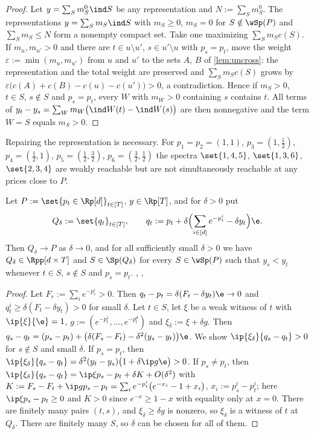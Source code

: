 \begin{proof}
Let $y=\sum_Sm^0_S\ind S$ be any representation and $N:=\sum_Sm^0_S$. The representations $y=\sum_Sm_S\ind S$ with $m_S\ge0$, $m_S=0$ for $S\notin\wSp(P)$ and $\sum_Sm_S\le N$ form a nonempty compact set. Take one maximizing $\sum_Sm_Sc(S)$. If $m_u,m_{u'}>0$ and there are $t\in u\setminus u'$, $s\in u'\setminus u$ with $p_s=p_t$, move the weight $\varepsilon:=\min(m_u,m_{u'})$ from $u$ and $u'$ to the sets $A$, $B$ of \cref{lem:uncross}: the representation and the total weight are preserved and $\sum_Sm_Sc(S)$ grows by $\varepsilon\bigl(c(A)+c(B)-c(u)-c(u')\bigr)>0$, a contradiction. Hence if $m_S>0$, $t\in S$, $s\notin S$ and $p_s=p_t$, every $W$ with $m_W>0$ containing $s$ contains $t$. All terms of $y_t-y_s=\sum_Wm_W\bigl(\ind W(t)-\ind W(s)\bigr)$ are then nonnegative and the term $W=S$ equals $m_S>0$.
\end{proof}

\begin{remark}
Repairing the representation is necessary. For $p_1=p_2=(1,1)$, $p_3=(1,\tfrac12)$, $p_4=(\tfrac12,1)$, $p_5=(\tfrac12,\tfrac32)$, $p_6=(\tfrac32,\tfrac12)$ the spectra $\set{1,4,5}$, $\set{1,3,6}$, $\set{2,3,4}$ are weakly reachable but are not simultaneously reachable at any prices close to $P$.
\end{remark}

\begin{lemma}[tilt]\label{lem:tilt}
Let $P:=\set{p_t\in\Rp[d]}_{t\in[T]}$, $y\in\Rp[T]$, and for $\delta>0$ put
\[
Q_\delta:=\set{q_t}_{t\in[T]},\qquad q_t:=p_t+\delta\Bigl(\sum_{i\in[d]}e^{-p^i_t}-\delta y_t\Bigr)\e .
\]
Then $Q_\delta\to P$ as $\delta\to0$, and for all sufficiently small $\delta>0$ we have $Q_\delta\in\Rpp[d\times T]$ and $S\in\Sp(Q_\delta)$ for every $S\in\wSp(P)$ such that $y_s<y_t$ whenever $t\in S$, $s\notin S$ and $p_s=p_t$. \hfill{}, , 
\end{lemma}

\begin{proof}
Let $F_r:=\sum_ie^{-p^i_r}>0$. Then $q_t-p_t=\delta(F_t-\delta y_t)\e\to0$ and $q^i_t\ge\delta(F_t-\delta y_t)>0$ for small $\delta$. Let $t\in S$, let $\xi$ be a weak witness of $t$ with $\ip{\xi}{\e}=1$, $g:=(e^{-p^1_t},\dots,e^{-p^d_t})$ and $\xi_\delta:=\xi+\delta g$. Then $q_s-q_t=(p_s-p_t)+\bigl(\delta(F_s-F_t)-\delta^2(y_s-y_t)\bigr)\e$. We show $\ip{\xi_\delta}{q_s-q_t}>0$ for $s\notin S$ and small $\delta$. If $p_s=p_t$, then $\ip{\xi_\delta}{q_s-q_t}=\delta^2(y_t-y_s)\bigl(1+\delta\ip g\e\bigr)>0$. If $p_s\ne p_t$, then $\ip{\xi_\delta}{q_s-q_t}=\ip\xi{p_s-p_t}+\delta K+O(\delta^2)$ with $K:=F_s-F_t+\ip g{p_s-p_t}=\sum_ie^{-p^i_t}\bigl(e^{-x_i}-1+x_i\bigr)$, $x_i:=p^i_s-p^i_t$; here $\ip\xi{p_s-p_t}\ge0$ and $K>0$ since $e^{-x}\ge1-x$ with equality only at $x=0$. There are finitely many pairs $(t,s)$, and $\xi_\delta\ge\delta g$ is nonzero, so $\xi_\delta$ is a witness of $t$ at $Q_\delta$. There are finitely many $S$, so $\delta$ can be chosen for all of them.
\end{proof}


